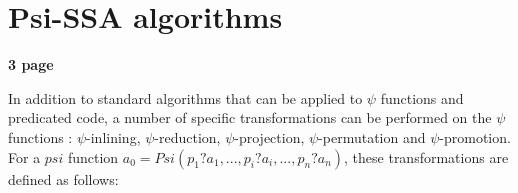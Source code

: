 \section{Psi-SSA algorithms}

\textbf{3 page}


In addition to standard algorithms that can be applied to $\psi$
functions and predicated code, a number of specific transformations
can be performed on the $\psi$ functions : $\psi$-inlining,
$\psi$-reduction, $\psi$-projection, $\psi$-permutation and
$\psi$-promotion. For a $psi$ function ${a_0 = Psi(p_1?a_1, ...,
  p_i?a_i, ..., p_n?a_n)}$, these transformations are defined as
follows:

